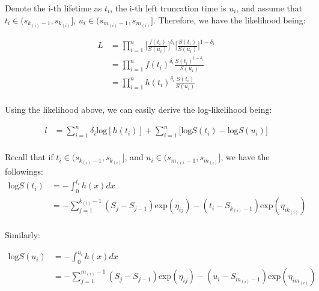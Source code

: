\documentclass[]{article}
\begin{document}
Denote the i-th lifetime as \(t_i\), the i-th left truncation time is
\(u_i\), and assume that \(t_i \in (s_{k_{(i)}-1},s_{k_{(i)}}]\),
\(u_i \in (s_{m_{(i)}-1},s_{m_{(i)}}]\). Therefore, we have the
likelihood being:

\begin{equation}\begin{aligned}\label{eqn:lt}
L &= \prod_{i=1}^{n} {\bigg[\frac{f(t_i)}{S(u_i)}\bigg]^{\delta_i}\bigg[\frac{S(t_i)}{S(u_i)}\bigg]^{1- \delta_i}} \\
  &= \prod_{i=1}^{n} {f(t_i)^{\delta_i}}{\frac{S(t_i)^{1-\delta_i}}{S(u_i)}} \\
  &= \prod_{i=1}^{n} {h(t_i)^{\delta_i}}{\frac{S(t_i)}{S(u_i)}} \\
\end{aligned}\end{equation}

Using the likelihood above, we can easily derive the log-likelihood
being:

\begin{equation}\begin{aligned}\label{eqn:lt_log}
l &= \sum_{i=1}^{n} {{\delta_i}\text{log}[h(t_i)]} + \sum_{i=1}^{n} {\big[\text{log}S(t_i)-\text{log}S(u_i)\big]}  \\
\end{aligned}\end{equation}

Recall that if \(t_i \in (s_{k_{(i)}-1},s_{k_{(i)}}]\), and
\(u_i \in (s_{m_{(i)}-1},s_{m_{(i)}}]\), we have the followings:
\begin{equation}\begin{aligned}\label{eqn:ltcase1}
\text{log}S(t_i) &= -\int_{0}^{t_i} h(x) dx \\
                 &= -\sum_{j=1}^{k_{(i)}-1} (S_j-S_{j-1})\text{exp}(\eta_{ij})-(t_i-S_{k_{(i)}-1})\text{exp}(\eta_{ik_{(i)}}) \\
\end{aligned}\end{equation}

Similarly:

\begin{equation}\begin{aligned}\label{eqn:ltcase2}
\text{log}S(u_i) &= -\int_{0}^{u_i} h(x) dx \\
                 &= -\sum_{j=1}^{m_{(i)}-1} (S_j-S_{j-1})\text{exp}(\eta_{ij})-(u_i-S_{m_{(i)}-1})\text{exp}(\eta_{im_{(i)}}) \\
\end{aligned}\end{equation}
\end{document}
